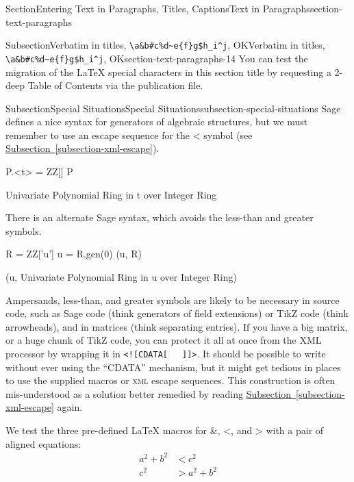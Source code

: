 \documentclass[twoside,10pt,]{article}
\newcommand{\xreffont}{\relax}
\newcommand{\mono}[1]{\texttt{#1}}
\newcommand{\initialism}[1]{\textsc{\MakeLowercase{#1}}}
\numberwithin{equation}{section}
\newcommand{\lt}{<}
\newcommand{\gt}{>}
\newcommand{\amp}{&}
\begin{document}
\begin{sectionptx}{Section}{Entering Text in Paragraphs, Titles, Captions}{}{Text in Paragraphs}{}{}{section-text-paragraphs}
\begin{subsectionptx}{Subsection}{Verbatim in titles, \mono{\textbackslash{}a\&b\#c\%d\textasciitilde{}e\{f\}g\$h\_i\textasciicircum{}j}, OK}{}{Verbatim in titles, \mono{\textbackslash{}a\&b\#c\%d\textasciitilde{}e\{f\}g\$h\_i\textasciicircum{}j}, OK}{}{}{section-text-paragraphs-14}
You can test the migration of the \LaTeX{} special characters in this section title by requesting a 2-deep Table of Contents via the publication file.%
\end{subsectionptx}
%
%
\typeout{************************************************}
\typeout{************************************************}
%
\begin{subsectionptx}{Subsection}{Special Situations}{}{Special Situations}{}{}{subsection-special-situations}
Sage defines a nice syntax for generators of algebraic structures, but we must remember to use an escape sequence for the \textless{} symbol (see \hyperref[subsection-xml-escape]{Subsection~{\xreffont\ref{subsection-xml-escape}}}).%
\begin{sageinput}
P.<t> = ZZ[]
P
\end{sageinput}
\begin{sageoutput}
Univariate Polynomial Ring in t over Integer Ring
\end{sageoutput}
There is an alternate Sage syntax, which avoids the less-than and greater symbols.%
\begin{sageinput}
R = ZZ['u']
u = R.gen(0)
(u, R)
\end{sageinput}
\begin{sageoutput}
(u, Univariate Polynomial Ring in u over Integer Ring)
\end{sageoutput}
Ampersands, less-than, and greater symbols are likely to be necessary in source code, such as Sage code (think generators of field extensions) or TikZ code (think arrowheads), and in matrices (think separating entries).  If you have a big matrix, or a huge chunk of TikZ code, you can protect it all at once from the XML processor by wrapping it in \mono{<![CDATA[}~~~\mono{]]>}.  It should be possible to write without ever using the ``CDATA'' mechanism, but it might get tedious in places to use the supplied macros or \initialism{XML} escape sequences.  This construction is often mis-understood as a solution better remedied by reading \hyperref[subsection-xml-escape]{Subsection~{\xreffont\ref{subsection-xml-escape}}} again.%
\par
We test the three pre-defined \LaTeX{} macros for \&, \textless{}, and \textgreater{} with a pair of aligned equations:%
\begin{align*}
a^2 + b^2\amp\lt c^2\\
c^2\amp\gt a^2 + b^2
\end{align*}
%
\end{subsectionptx}

\end{sectionptx}
\end{document}
